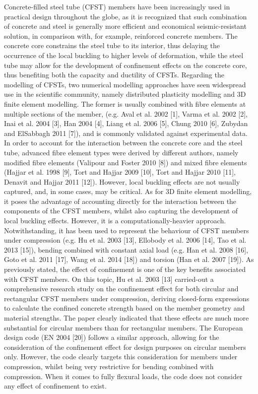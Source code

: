 Concrete-filled steel tube (CFST) members have been increasingly used in practical design throughout the globe, as it is recognized that such combination of concrete and steel is generally more efficient and economical seismic-resistant solution, in comparison with, for example, reinforced concrete members. The concrete core constrains the steel tube to its interior, thus delaying the occurrence of the local buckling to higher levels of deformation, while the steel tube may allow for the development of confinement effects on the concrete core, thus benefiting both the capacity and ductility of CFSTs.
Regarding the modelling of CFSTs, two numerical modelling approaches have seen widespread use in the scientific community, namely distributed plasticity modelling and 3D finite element modelling. The former is usually combined with fibre elements at multiple sections of the member, (e.g. Aval et al. 2002 [1], Varma et al. 2002 [2], Inai et al. 2004 [3], Han 2004 [4], Liang et al. 2006 [5], Chung 2010 [6], Zubydan and ElSabbagh 2011 [7]), and is commonly validated against experimental data. In order to account for the interaction between the concrete core and the steel tube, advanced fibre element types were derived by different authors, namely modified fibre elements (Valipour and Foster 2010 [8]) and mixed fibre elements (Hajjar et al. 1998 [9], Tort and Hajjar 2009 [10], Tort and Hajjar 2010 [11], Denavit and Hajjar 2011 [12]). However, local buckling effects are not usually captured, and, in some cases, may be critical. As for 3D finite element modelling, it poses the advantage of accounting directly for the interaction between the components of the CFST members, whilst also capturing the development of local buckling effects. However, it is a computationally-heavier approach. Notwithstanding, it has been used to represent the behaviour of CFST members under compression (e.g. Hu et al. 2003 [13], Ellobody et al. 2006 [14], Tao et al. 2013 [15]), bending combined with constant axial load (e.g. Han et al. 2008 [16], Goto et al. 2011 [17], Wang et al. 2014 [18]) and torsion (Han et al. 2007 [19]).
As previously stated, the effect of confinement is one of the key benefits associated with CFST members. On this topic, Hu et al. 2003 [13] carried-out a comprehensive research study on the confinement effect for both circular and rectangular CFST members under compression, deriving closed-form expressions to calculate the confined concrete strength based on the member geometry and material strengths. The paper clearly indicated that these effects are much more substantial for circular members than for rectangular members. The European design code (EN 2004 [20]) follows a similar approach, allowing for the consideration of the confinement effect for design purposes on circular members only. However, the code clearly targets this consideration for members under compression, whilst being very restrictive for bending combined with compression. When it comes to fully flexural loads, the code does not consider any effect of confinement to exist.

